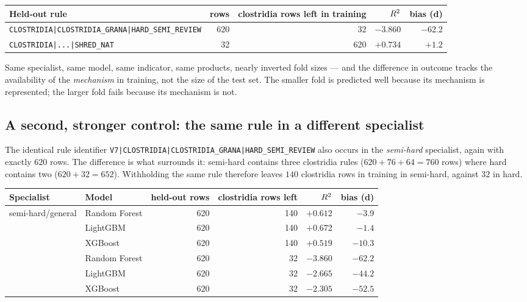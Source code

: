 \begin{center}\small
\begin{tabular}{lrrrr}
\toprule
Held-out rule & rows & clostridia rows left in training & $R^2$ & bias (d) \\
\midrule
\texttt{CLOSTRIDIA|CLOSTRIDIA\_GRANA|HARD\_SEMI\_REVIEW} & 620 & 32 & $-3.860$ & $-62.2$ \\
\texttt{CLOSTRIDIA|...|SHRED\_NAT} & 32 & 620 & $\mathbf{+0.734}$ & $+1.2$ \\
\bottomrule
\end{tabular}
\end{center}

Same specialist, same model, same indicator, same products, nearly
inverted fold sizes --- and the difference in outcome tracks the
availability of the \emph{mechanism} in training, not the size of the test
set. The smaller fold is predicted well because its mechanism is
represented; the larger fold fails because its mechanism is not.

\subsection{A second, stronger control: the same rule in a different specialist}

The identical rule identifier
\texttt{V7|CLOSTRIDIA|CLOSTRIDIA\_GRANA|HARD\_SEMI\_REVIEW} also occurs in
the \emph{semi-hard} specialist, again with exactly $620$ rows. The
difference is what surrounds it: semi-hard contains three clostridia rules
($620 + 76 + 64 = 760$ rows) where hard contains two ($620 + 32 = 652$).
Withholding the same rule therefore leaves $140$ clostridia rows in
training in semi-hard, against $32$ in hard.

\begin{center}\small
\begin{tabular}{llrrrr}
\toprule
Specialist & Model & held-out rows & clostridia rows left & $R^2$ & bias (d) \\
\midrule
\multirow{3}{*}{semi-hard/general} & Random Forest & 620 & 140 & $+0.612$ & $-3.9$ \\
 & LightGBM & 620 & 140 & $+0.672$ & $-1.4$ \\
 & XGBoost & 620 & 140 & $+0.519$ & $-10.3$ \\
\addlinespace[3pt]
\multirow{3}{*}{hard/general} & Random Forest & 620 & 32 & $-3.860$ & $-62.2$ \\
 & LightGBM & 620 & 32 & $-2.665$ & $-44.2$ \\
 & XGBoost & 620 & 32 & $-2.305$ & $-52.5$ \\
\bottomrule
\end{tabular}
\end{center}

